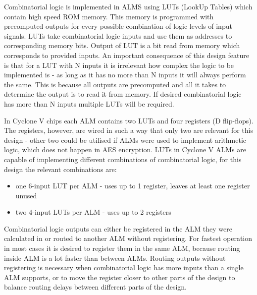 Combinatorial logic is implemented in ALMS using LUTs (LookUp Tables) which contain high speed ROM memory. This memory is programmed with precomputed outputs for every possible combination of logic levels of input signals. LUTs take combinatorial logic inputs and use them as addresses to corresponding memory bits. Output of LUT is a bit read from memory which corresponds to provided inputs. An important consequence of this design feature is that for a LUT with N inputs it is irrelevant how complex the logic to be implemented is - as long as it has no more than N inputs it will always perform the same. This is because all outputs are precomputed and all it takes to determine the output is to read it from memory. If desired combinatorial logic has more than N inputs multiple LUTs will be required.

In Cyclone V chips each ALM contains two LUTs and four registers (D flip-flops). The registers, however, are wired in such a way that only two are relevant for this design - other two could be utilised if ALMs were used to implement arithmetic logic, which does not happen in AES encryption. LUTs in Cyclone V ALMs are capable of implementing different combinations of combinatorial logic, for this design the relevant combinations are:
\begin{itemize}
\item one 6-input LUT per ALM - uses up to 1 register, leaves at least one register unused
\item two 4-input LUTs per ALM - uses up to 2 registers
\end{itemize}
Combinatorial logic outputs can either be registered in the ALM they were calculated in or routed to another ALM without registering. For fastest operation in most cases it is desired to register them in the same ALM, because routing inside ALM is a lot faster than between ALMs. Routing outputs without registering is necessary when combinatorial logic has more inputs than a single ALM supports, or to move the register closer to other parts of the design to balance routing delays between different parts of the design.

